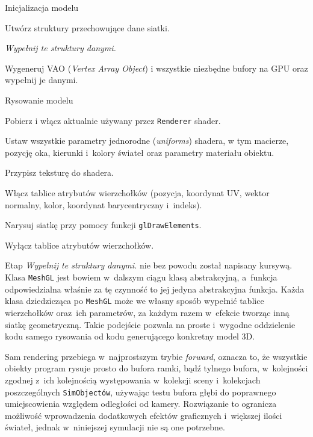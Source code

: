 		\begin{algorithm}[H]
			\label{alg_4_4}
			\caption{Inicjalizacja modelu}	
			
			Utwórz struktury przechowujące dane siatki.
			
			\emph{Wypełnij te struktury danymi.}
			
			Wygeneruj VAO (\emph{Vertex Array Object}) i wszystkie niezbędne bufory na GPU oraz wypełnij je danymi.
		\end{algorithm}
		\newpage
		
		\begin{algorithm}[H]
			\label{alg_4_5}
			\caption{Rysowanie modelu}	
			
			Pobierz i włącz aktualnie używany przez \texttt{Renderer} shader.
			
			Ustaw wszystkie parametry jednorodne (\emph{uniforms}) shadera, w tym macierze, pozycję oka, kierunki i~kolory świateł oraz parametry materiału obiektu.
			
			Przypisz teksturę do shadera.
			
			Włącz tablice atrybutów wierzchołków (pozycja, koordynat UV, wektor normalny, kolor, koordynat barycentryczny i~indeks).
			
			Narysuj siatkę przy pomocy funkcji \texttt{glDrawElements}.
			
			Wyłącz tablice atrybutów wierzchołków.\newline
		\end{algorithm}
		
		
		Etap \emph{Wypełnij te struktury danymi.} nie bez powodu został napisany kursywą. Klasa \texttt{MeshGL} jest bowiem w~dalszym ciągu klasą abstrakcyjną, a~funkcja odpowiedzialna właśnie za tę czynność to jej jedyna abstrakcyjna funkcja. Każda klasa dziedzicząca po \texttt{MeshGL} może we własny sposób wypełnić tablice wierzchołków oraz~ich parametrów, za każdym razem w~efekcie tworząc inną siatkę geometryczną. Takie podejście pozwala na proste i~wygodne oddzielenie kodu samego rysowania od kodu generującego konkretny model 3D.
		
		Sam rendering przebiega w~najprostszym trybie \emph{forward}, oznacza to, że wszystkie obiekty program rysuje prosto do bufora ramki, bądź tylnego bufora, w~kolejności zgodnej z~ich kolejnością występowania w~kolekcji sceny i~kolekcjach poszczególnych \texttt{SimObjectów}, używając testu bufora głębi do poprawnego umiejscowienia względem odległości od kamery. Rozwiązanie to ogranicza możliwość wprowadzenia dodatkowych efektów graficznych i~większej ilości świateł, jednak w~niniejszej symulacji nie są one potrzebne.
		
